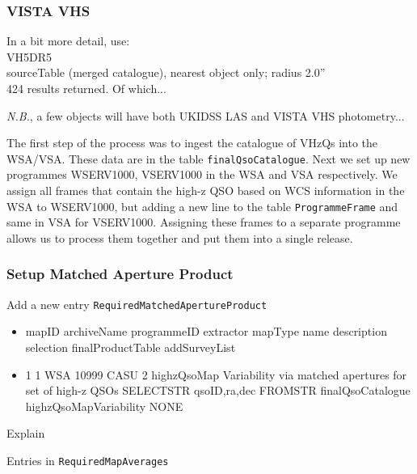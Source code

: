 \documentclass[usenatbib]{mnras}
\begin{document}
    \subsubsection{VISTA VHS} 
    In a bit more detail, use:\\
    VH5DR5 \\
    sourceTable (merged catalogue), nearest object only; radius 2.0'' \\
    424 results returned.  Of which...
    
    {\it N.B.}, a few objects will have both UKIDSS LAS and VISTA VHS photometry...
    
    The first step of the process was to ingest the catalogue of VHzQs into
    the WSA/VSA. These data are in the table \verb+finalQsoCatalogue+. Next we set
    up new programmes WSERV1000, VSERV1000 in the WSA and VSA respectively. We
    assign all frames that contain the high-z QSO based on WCS information in the
    WSA to WSERV1000, but adding a new line to the table \verb+ProgrammeFrame+ and
    same in VSA for VSERV1000. Assigning these frames to a separate programme allows
    us to process them together and put them into a single release. 
    
    \subsubsection{Setup Matched Aperture Product}
    
    Add a new entry \verb+RequiredMatchedApertureProduct+

    \begin{itemize}
    \item mapID	archiveName	programmeID	extractor	mapType	name	description	selection	finalProductTable	addSurveyList
    \item 1	1	WSA	10999	CASU	2	highzQsoMap	Variability via matched apertures for set of high-z QSOs	SELECTSTR qsoID,ra,dec FROMSTR finalQsoCatalogue	highzQsoMapVariability	NONE
    \end{itemize}
    
    Explain
    
    Entries in \verb+RequiredMapAverages+
    
\end{document}
